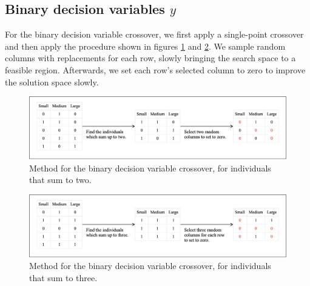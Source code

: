 \documentclass[mscthesis, 11pt]{usiinfthesis}
\theoremstyle{newdefinition}
\begin{document}
\subsection{Binary decision variables $y$}\label{sec:bin_dec_var}
For the binary decision variable crossover, we first apply a single-point crossover and then apply the procedure shown in figures \ref{fig:binary_crossover_two} and \ref{fig:binary_crossover_three}. We sample random columns with replacements for each row, slowly bringing the search space to a feasible region.  Afterwards, we set each row's selected column to zero to improve the solution space slowly.
\begin{figure}[ht]
    \centering
    \includegraphics[width=\linewidth]{methodology/binary_crossover_operator_two.png}
    \caption{Method for the binary decision variable crossover, for individuals that sum to two.}
    \label{fig:binary_crossover_two}
\end{figure}
\begin{figure}[ht]
    \centering
    \includegraphics[width=\linewidth]{methodology/binary_crossover_operator_three.png}
    \caption{Method for the binary decision variable crossover, for individuals that sum to three.}
    \label{fig:binary_crossover_three}
\end{figure}
\end{document}
